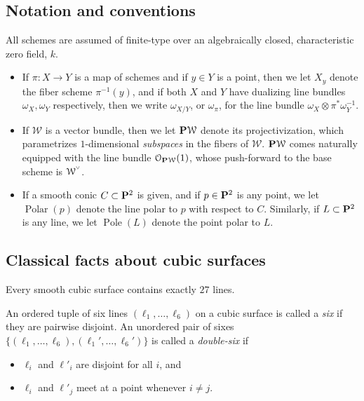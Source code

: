 \documentclass[12pt,reqno]{amsart}
\renewcommand{\k}{k}
\DeclareMathOperator{\Polar}{Polar}
\DeclareMathOperator{\Pole}{Pole}
\renewcommand{\to}{{\longrightarrow}}
\numberwithin{equation}{section}
\renewcommand{\O}{\mathcal O}
\newcommand{\smvee}{\raise0.5ex\hbox{$\scriptscriptstyle\vee$}}
\begin{document}
\subsection{Notation and conventions}
\label{sec:notation-conventions}
All schemes are assumed of finite-type over an algebraically closed,
characteristic zero field, $\k$.

\begin{itemize}

\item If $\pi: X \to Y$ is a map of schemes and if $y \in Y$ is a
  point, then we let $X_y$ denote the fiber scheme $\pi^{-1}(y)$, and
  if both $X$ and $Y$ have dualizing line bundles
  $\omega_{X}, \omega_{Y}$ respectively, then we write $\omega_{X/Y}$,
  or $\omega_{\pi}$, for the line bundle
  $\omega_{X} \otimes \pi^{*}\omega_{Y}^{-1}$.
\item If $\mathcal{W}$ is a
  vector bundle, then we let $\P \mathcal{W}$ denote its
  projectivization, which parametrizes $1$-dimensional {\sl subspaces}
  in the fibers of $\mathcal{W}$. $\P \mathcal{W}$ comes naturally
  equipped with the line bundle $\O_{\P \mathcal{W}}(1)$, whose
  push-forward to the base scheme is $\mathcal{W}^{\smvee}$.

\item If a smooth conic $C \subset \P^{2}$ is given, and if
  $p \in \P^{2}$ is any point, we let $\Polar(p)$ denote the line
  polar to $p$ with respect to $C$.  Similarly, if $L \subset \P^{2}$
  is any line, we let $\Pole(L)$ denote the point polar to $L$.

\end{itemize}


\subsection{Classical facts about cubic surfaces}
\label{sec:classical-facts}

\begin{theorem}
  \label{theorem:cayleysalmon} Every smooth cubic surface contains
  exactly $27$ lines.
\end{theorem}

An ordered tuple of six lines $(\ell_1, \dots, \ell_6)$ on a cubic
surface is called a {\sl six} if they are pairwise disjoint.  An
unordered pair of sixes
$\{(\ell_1, \dots, \ell_6), (\ell_1', \dots, \ell_6')\}$ is called a
{\sl double-six} if
\begin{itemize}
\item $\ell_{i}$ and $\ell'_{i}$ are disjoint for all $i$, and
\item $\ell_{i}$ and $\ell'_{j}$ meet at a point whenever $i \neq j$.
  \end{itemize}
\end{document}

